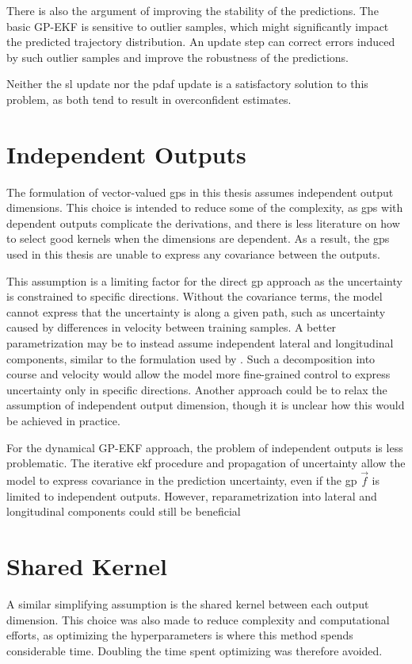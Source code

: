 There is also the argument of improving the stability of the predictions. The basic GP-EKF is sensitive to outlier samples, which might significantly impact the predicted trajectory distribution. An update step can correct errors induced by such outlier samples and improve the robustness of the predictions. 

Neither the \acrshort{sl} update nor the \acrshort{pdaf} update is a satisfactory solution to this problem, as both tend to result in overconfident estimates.  



\section{Independent Outputs}
The formulation of vector-valued \acrshort{gp}s in this thesis assumes independent output dimensions. This choice is intended to reduce some of the complexity, as \acrshort{gp}s with dependent outputs complicate the derivations, and there is less literature on how to select good kernels when the dimensions are dependent. As a result, the \acrshort{gp}s used in this thesis are unable to express any covariance between the outputs. 

This assumption is a limiting factor for the direct \acrshort{gp} approach as the uncertainty is constrained to specific directions. Without the covariance terms, the model cannot express that the uncertainty is along a given path, such as uncertainty caused by differences in velocity between training samples. A better parametrization may be to instead assume independent lateral and longitudinal components, similar to the formulation used by \cite{gp_ais_trajectory}. Such a decomposition into course and velocity would allow the model more fine-grained control to express uncertainty only in specific directions. Another approach could be to relax the assumption of independent output dimension, though it is unclear how this would be achieved in practice. 

For the dynamical GP-EKF approach, the problem of independent outputs is less problematic. The iterative \acrshort{ekf} procedure and propagation of uncertainty allow the model to express covariance in the prediction uncertainty, even if the \acrshort{gp} $\vec{f}$ is limited to independent outputs. However, reparametrization into lateral and longitudinal components could still be beneficial

\section{Shared Kernel}
A similar simplifying assumption is the shared kernel between each output dimension. This choice was also made to reduce complexity and computational efforts, as optimizing the hyperparameters is where this method spends considerable time. Doubling the time spent optimizing was therefore avoided. 

